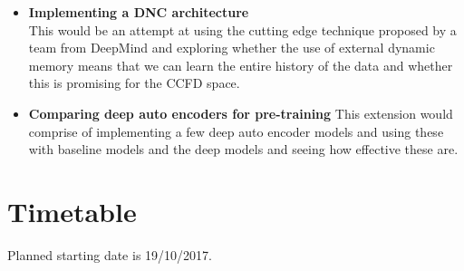 \documentclass[12pt,a4paper,twoside]{article}
\begin{document}
\begin{itemize}
\item
	\textbf{Implementing a DNC architecture } \\
	This would be an attempt at using the cutting edge technique proposed by a team from DeepMind \cite{graves2016hybrid} and exploring whether the use of external dynamic memory means that we can learn the entire history of the data and whether this is promising for the CCFD space. 
\item
	\textbf{Comparing deep auto encoders for pre-training }
	This extension would comprise of implementing a few deep auto encoder models and using these with baseline models and the deep models and seeing how effective these are.
\end{itemize} 

\section*{Timetable}

Planned starting date is 19/10/2017.
\end{document}
